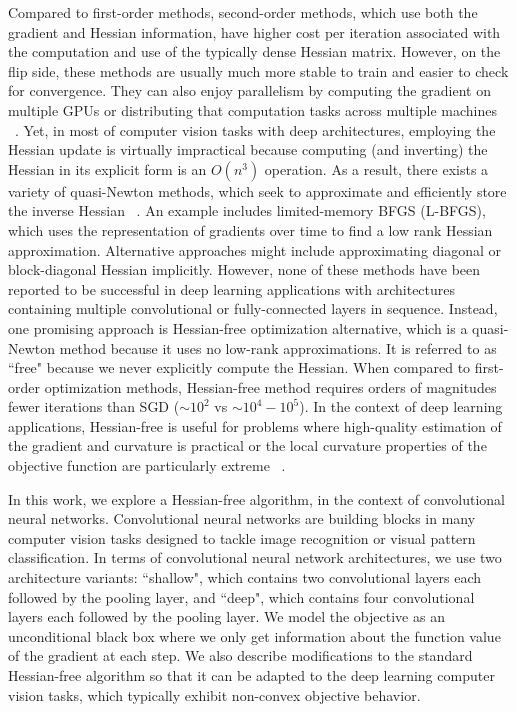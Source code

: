 \documentclass[10pt,twocolumn,letterpaper]{article}
\begin{document}
Compared to first-order methods, second-order methods, which use both the gradient and Hessian information, have higher cost per iteration associated with the computation and use of the typically dense Hessian matrix. However, on the flip side, these methods are usually much more stable to train and easier to check for convergence. They can also enjoy parallelism by computing the gradient on multiple GPUs  or distributing that computation tasks across multiple machines ~\cite{Raina09}. Yet, in most of computer vision tasks with deep architectures, employing the Hessian update is virtually impractical because computing (and inverting) the Hessian in its explicit form is an $O(n^3)$ operation. As a result, there exists a variety of quasi-Newton methods, which seek to approximate and efficiently store the inverse Hessian ~\cite{Pearlmutter94}. An example includes limited-memory BFGS (L-BFGS), which uses the representation of gradients over time to find a low rank Hessian approximation. Alternative approaches might include approximating diagonal or block-diagonal Hessian implicitly. However, none of these methods have been reported to be successful in deep learning applications with architectures containing multiple convolutional or fully-connected layers in sequence. Instead, one promising approach is Hessian-free optimization alternative, which is a quasi-Newton method because it uses no low-rank approximations. It is referred to as ``free" because we never explicitly compute the Hessian. When compared to first-order optimization methods, Hessian-free method requires orders of magnitudes fewer iterations than SGD ($\sim 10^2$ vs  $\sim 10^4 - 10^5$). In the context of deep learning applications, Hessian-free is useful for problems where high-quality estimation of the gradient and curvature is practical or the local curvature properties of the objective function are particularly extreme ~\cite{Boulanger-Lewandowsk12, Kingsbury12, Kiros13, Hochreiter97}.



In this work, we explore a Hessian-free algorithm, in the context of convolutional neural networks. Convolutional neural networks are building blocks in many computer vision tasks designed to tackle image recognition or visual pattern classification. In terms of convolutional neural network architectures, we use two architecture variants: ``shallow", which contains two convolutional layers each followed by the pooling layer, and ``deep", which contains four convolutional layers each followed by the pooling layer. We model the objective as an unconditional black box where we only get information about the function value of the gradient at each step. We also describe modifications to the standard Hessian-free algorithm so that it can be adapted to the deep learning computer vision tasks, which typically exhibit non-convex objective behavior.
\end{document}
